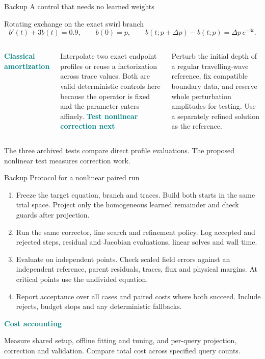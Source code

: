 \documentclass[aspectratio=169,11pt]{beamer}
\newcommand{\smallnote}[1]{{\footnotesize\color{muted}#1\par}}
\newcommand{\lead}[1]{\textcolor{teal}{\textbf{#1}}}
\begin{document}
\begin{frame}[t]{Backup \enspace A control that needs no learned weights}
\small
\begin{block}{Rotating exchange on the exact swirl branch}
\[
 b'(t)+3b(t)=0.9,\qquad b(0)=p,\qquad
 b(t;p+\Delta p)-b(t;p)=\Delta p\,e^{-3t}.
\]
\end{block}
\begin{columns}[T,onlytextwidth]
\lead{Classical amortization}\par\smallskip
Interpolate two exact endpoint profiles or reuse a factorization across
trace values. Both are valid deterministic controls here because the
operator is fixed and the parameter enters affinely.
\lead{Test nonlinear correction next}\par\smallskip
Perturb the initial depth of a regular travelling-wave reference,
fix compatible boundary data, and reserve whole perturbation amplitudes
for testing. Use a separately refined solution as the reference.
\end{columns}
\smallskip
\smallnote{The three archived tests compare direct profile evaluations. The proposed nonlinear test measures correction work.}
\end{frame}

\begin{frame}[t]{Backup \enspace Protocol for a nonlinear paired run}
\small
\begin{enumerate}
\item Freeze the target equation, branch and traces. Build both starts
in the same trial space. Project only the homogeneous learned
remainder and check guards after projection.
\item Run the same corrector, line search and refinement policy. Log
accepted and rejected steps, residual and Jacobian evaluations,
linear solves and wall time.
\item Evaluate on independent points. Check scaled field errors against
an independent reference, parent residuals, traces, flux and physical
margins. At critical points use the undivided equation.
\item Report acceptance over all cases and paired costs where both
succeed. Include rejects, budget stops and any deterministic fallbacks.
\end{enumerate}
\smallskip
\lead{Cost accounting}\par
Measure shared setup, offline fitting and tuning, and per-query
projection, correction and validation. Compare total cost across
specified query counts.
\end{frame}
\end{document}
